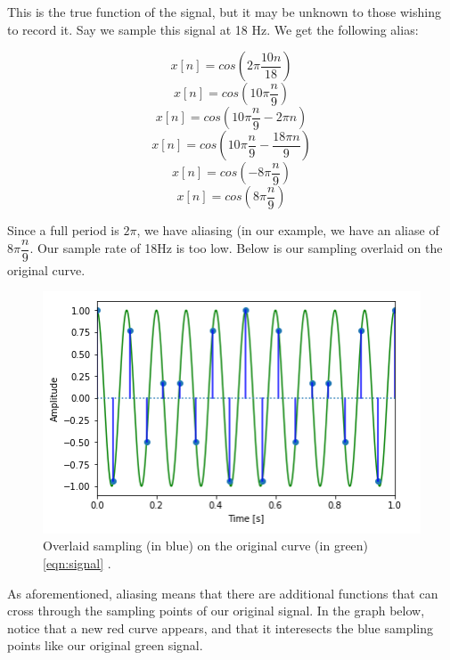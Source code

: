 This is the true function of the signal, but it may be unknown to those wishing to record it.  Say we sample this signal at 18 Hz.  We get the following alias:

\begin{equation}
x[n]=cos(2\pi\dfrac{10n}{18})
\end{equation}
\begin{equation}
x[n]=cos(10\pi\dfrac{n}{9})
\end{equation}
\begin{equation}
x[n]=cos(10\pi\dfrac{n}{9}-2\pi n)
\end{equation}
\begin{equation}
x[n]=cos(10\pi\dfrac{n}{9}-\dfrac{18\pi n}{9})
\end{equation}
\begin{equation}
x[n]=cos(-8\pi\dfrac{n}{9})
\end{equation}
\begin{equation}
x[n]=cos(8\pi\dfrac{n}{9})
\end{equation}

Since a full period is \(2\pi\), we have aliasing (in our example, we have an aliase of \(8\pi\dfrac{n}{9}\).  Our sample rate of 18Hz is too low. Below is our sampling overlaid on the original curve.

\begin{figure}[H]
	\centering
	\includegraphics[scale = 1]{sub_sample.png} %
	\caption{Overlaid sampling (in blue) on the original curve (in green) \ref{eqn:signal} \cite{notebook:sampling}.}
	\label{fig:sub_sample}
\end{figure}    

As aforementioned, aliasing means that there are additional functions that can cross through the sampling points of our original signal. In the graph below, notice that a new red curve appears, and that it interesects the blue sampling points like our original green signal.


